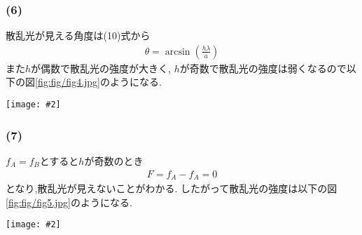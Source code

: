 \documentclass[uplatex,a4j,11pt,dvipdfmx]{jsarticle}
\makeatletter
\def\fgcaption{\def\@captype{figure}\caption}
\newcommand{\mfig}[3][width=15cm]{
\begin{center}
\texttt{[image: \#2]}
\fgcaption{#3 \label{fig:#2}}
\end{center}
}
\makeatother
\begin{document}
\subsubsection*{(6)}
散乱光が見える角度は(10)式から
\begin{align}
  \theta=\arcsin\left(\frac{h\lambda}{a}\right)
\end{align}
また$h$が偶数で散乱光の強度が大きく,
$h$が奇数で散乱光の強度は弱くなるので以下の図\ref{fig:fig/fig4.jpg}のようになる.
\mfig[width=10cm]{fig/fig4.jpg}{散乱光の強度分布}
\subsubsection*{(7)}
$f_A=f_B$とすると$h$が奇数のとき
\begin{align}
  F=f_A-f_A=0
\end{align}
となり,散乱光が見えないことがわかる.
したがって散乱光の強度は以下の図\ref{fig:fig/fig5.jpg}のようになる.
\mfig[width=10cm]{fig/fig5.jpg}{散乱光の強度分布($f_A=f_B$)}
\end{document}
